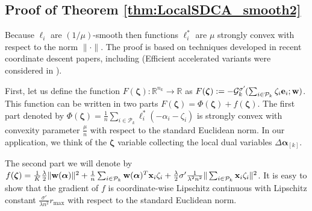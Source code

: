 \documentclass{article}
\newcommand{\R}{\mathbb{R}}                      %
\newcommand{\xv}{ {\bf x}}
\newcommand{\wv}{ {\bf w}}
\newcommand{\alphav}{ {\boldsymbol \alpha}}
\newcommand{\zetav}{ {\boldsymbol \zeta}}
\newcommand{\ev}{ {\bf e}}
\newcommand{\0}{ {\bf 0}}
\newcommand{\vsubset}[2]{#1_{[#2]}}
\newcommand{\Ggk}{\mathcal{G}^{\sigma'}_k\hspace{-0.08em}}
\theoremstyle{plain}
\theoremstyle{definition}
\begin{document}
{\subsection{Proof of Theorem \ref{thm:LocalSDCA_smooth2}}

Because $\ell_i$ are $(1/\mu)$-smooth then 
functions
$\ell_i^*$ are $\mu$
strongly convex with respect to the norm $\|\cdot\|$.
The proof is based on
techniques developed in recent coordinate descent papers, including
\cite{richtarik,
richtarik2013distributed,richtarikBigData,TTR:IMPROVRED,
marecek2014distributed,APPROX,lu2013complexity,fercoq2014fast,ALPHA,QUARTZ} (Efficient accelerated variants were considered in \cite{APPROX,  ASDCA}).

First, let us define the
function
$F(\zetav): \R^{n_k} \to \R$
as 
$F(\zetav) := -\Ggk( 
\sum_{i \in \mathcal{P}_k} \zeta_i \ev_i; \wv)
$.  This function can be written in two parts
$F(\zetav) = \Phi(\zetav) + f(\zetav)$.
The first part
denoted by 
$\Phi(\zetav)
 =\frac1n\sum_{i \in \mathcal{P}_k} 
\ell_i^*(-\alpha_i - \zeta_i)$
is strongly convex
with convexity parameter
$\frac{\mu}{n}$
with respect to the standard Euclidean norm.
In our application, we think of the $\zetav$ variable collecting the local dual variables $\vsubset{\Delta \alphav}{k}$.

The second part
we will denote by
$f(\zetav)
 = 
  \frac1K 
\frac{\lambda}{2}
\|\wv(\alphav)\|^2
+\frac1n
\sum_{i \in \mathcal{P}_k}
\wv(\alphav)^T \xv_i \zeta_i
+
\frac\lambda2
 \sigma'  
\frac1{\lambda^2 n^2} 
 \| \sum_{i \in \mathcal{P}_k}  \xv_i \zeta_i \|^2 
 $.
It is easy to show
that the gradient of $f$ is coordinate-wise Lipschitz  
 continuous
with Lipschitz constant
$ \frac{\sigma'}{\lambda n^2} r_{\max}$
with respect to the standard Euclidean norm.

}
\end{document}
